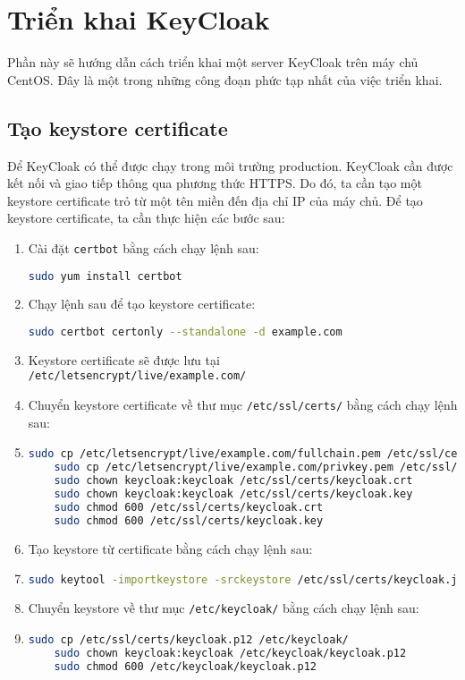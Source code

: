 \chapter{Triển khai KeyCloak}
\label{Chapter2}
Phần này sẽ hướng dẫn cách triển khai một server KeyCloak trên máy chủ CentOS. Đây là một trong những công đoạn phức tạp nhất của việc triển khai.

\section{Tạo keystore certificate}
Để KeyCloak có thể được chạy trong môi trường production. KeyCloak cần được kết nối và giao tiếp thông qua phương thức HTTPS. Do đó, ta cần tạo một keystore certificate trỏ từ
một tên miền đến địa chỉ IP của máy chủ. Để tạo keystore certificate, ta cần thực hiện các bước sau:
\begin{enumerate}
    \item Cài đặt \texttt{certbot} bằng cách chạy lệnh sau:
    \begin{lstlisting}[language=bash]
    sudo yum install certbot
    \end{lstlisting}
    \item Chạy lệnh sau để tạo keystore certificate:
    \begin{lstlisting}[language=bash]
    sudo certbot certonly --standalone -d example.com
    \end{lstlisting}
    \item Keystore certificate sẽ được lưu tại \\
    \texttt{/etc/letsencrypt/live/example.com/}
    \item Chuyển keystore certificate về thư mục \texttt{/etc/ssl/certs/} bằng cách chạy lệnh sau:
    \item \begin{lstlisting}[language=bash]
    sudo cp /etc/letsencrypt/live/example.com/fullchain.pem /etc/ssl/certs/keycloak.crt
    sudo cp /etc/letsencrypt/live/example.com/privkey.pem /etc/ssl/certs/keycloak.key
    sudo chown keycloak:keycloak /etc/ssl/certs/keycloak.crt
    sudo chown keycloak:keycloak /etc/ssl/certs/keycloak.key
    sudo chmod 600 /etc/ssl/certs/keycloak.crt
    sudo chmod 600 /etc/ssl/certs/keycloak.key
    \end{lstlisting}
    \item Tạo keystore từ certificate bằng cách chạy lệnh sau:
    \item \begin{lstlisting}[language=bash]
    sudo keytool -importkeystore -srckeystore /etc/ssl/certs/keycloak.jks -destkeystore /etc/ssl/certs/keycloak.p12 -deststoretype PKCS12
    \end{lstlisting}
    \item Chuyển keystore về thư mục \texttt{/etc/keycloak/} bằng cách chạy lệnh sau:
    \item \begin{lstlisting}[language=bash]
    sudo cp /etc/ssl/certs/keycloak.p12 /etc/keycloak/
    sudo chown keycloak:keycloak /etc/keycloak/keycloak.p12
    sudo chmod 600 /etc/keycloak/keycloak.p12
    \end{lstlisting}
\end{enumerate}


